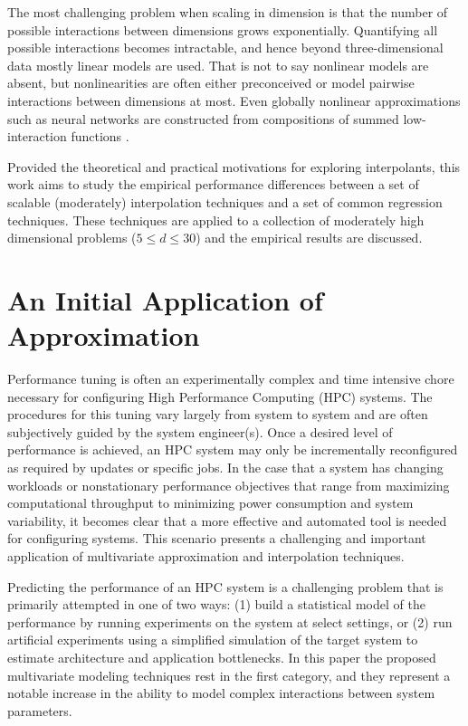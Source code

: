 The most challenging problem when scaling in dimension is that the
number of possible interactions between dimensions grows
exponentially. Quantifying all possible interactions becomes
intractable, and hence beyond three-dimensional data mostly linear
models are used. That is not to say nonlinear models are absent, but
nonlinearities are often either preconceived or model pairwise
interactions between dimensions at most. Even globally nonlinear
approximations such as neural networks are constructed from
compositions of summed low-interaction functions
\cite{clevert2015fast}.

Provided the theoretical and practical motivations for exploring
interpolants, this work aims to study the empirical performance
differences between a set of scalable (moderately) interpolation
techniques and a set of common regression techniques. These techniques
are applied to a collection of moderately high dimensional problems
($5 \le d \le 30$) and the empirical results are discussed.

\section{An Initial Application of Approximation}

Performance tuning is often an experimentally complex and time
intensive chore necessary for configuring High Performance Computing
(HPC) systems. The procedures for this tuning vary largely from system
to system and are often subjectively guided by the system
engineer(s). Once a desired level of performance is achieved, an HPC
system may only be incrementally reconfigured as required by updates
or specific jobs. In the case that a system has changing workloads or
nonstationary performance objectives that range from maximizing
computational throughput to minimizing power consumption and system
variability, it becomes clear that a more effective and automated tool
is needed for configuring systems. This scenario presents a
challenging and important application of multivariate approximation
and interpolation techniques.

Predicting the performance of an HPC system is a challenging problem
that is primarily attempted in one of two ways: (1) build a
statistical model of the performance by running experiments on the
system at select settings, or (2) run artificial experiments using a
simplified simulation of the target system to estimate architecture
and application bottlenecks. In this paper the proposed multivariate
modeling techniques rest in the first category, and they represent a
notable increase in the ability to model complex interactions between
system parameters.

